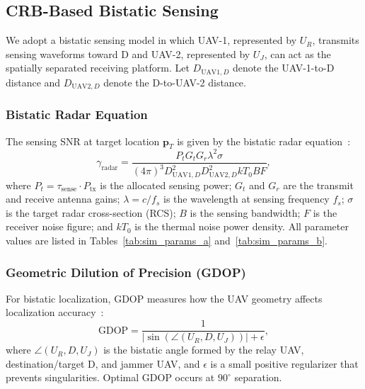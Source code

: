 \documentclass[journal]{IEEEtran}
\begin{document}
\subsection{CRB-Based Bistatic Sensing}
We adopt a bistatic sensing model in which UAV-1, represented by $U_R$, transmits sensing waveforms toward D and UAV-2, represented by $U_J$, can act as the spatially separated receiving platform. Let $D_{\text{UAV1},D}$ denote the UAV-1-to-D distance and $D_{\text{UAV2},D}$ denote the D-to-UAV-2 distance.

\subsubsection{Bistatic Radar Equation}
The sensing SNR at target location $\mathbf{p}_T$ is given by the bistatic radar equation~\cite{zhang2023drlisac}:
\begin{equation}
\gamma_{\text{radar}} = \frac{P_t G_t G_r \lambda^2 \sigma}{(4\pi)^3 D_{\text{UAV1},D}^2 D_{\text{UAV2},D}^2 k T_0 B F},
\label{eq:radar_snr}
\end{equation}
where $P_t = \tau_{\text{sense}} \cdot P_{\text{tx}}$ is the allocated sensing power; $G_t$ and $G_r$ are the transmit and receive antenna gains; $\lambda = c / f_s$ is the wavelength at sensing frequency $f_s$; $\sigma$ is the target radar cross-section (RCS); $B$ is the sensing bandwidth; $F$ is the receiver noise figure; and $kT_0$ is the thermal noise power density. All parameter values are listed in Tables~\ref{tab:sim_params_a} and~\ref{tab:sim_params_b}.

\subsubsection{Geometric Dilution of Precision (GDOP)}
For bistatic localization, GDOP measures how the UAV geometry affects localization accuracy~\cite{zhang2023drlisac}:
\begin{equation}
\text{GDOP} = \frac{1}{|\sin(\angle(U_R,D,U_J))| + \epsilon},
\label{eq:gdop}
\end{equation}
where $\angle(U_R,D,U_J)$ is the bistatic angle formed by the relay UAV, destination/target D, and jammer UAV, and $\epsilon$ is a small positive regularizer that prevents singularities. Optimal GDOP occurs at $90^\circ$ separation.
\end{document}
